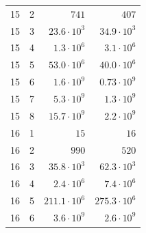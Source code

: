 \documentclass[a4paper,UKenglish,cleveref, autoref, thm-restate, anonymous]{lipics-v2021}
\begin{document}
\begin{table}[!t]
\begin{tabular}{c|c|r|r}
    15  & 2   & $741$                   & $407$                    \\
    15  & 3   & $23.6 \cdot 10^3$       & $34.9 \cdot 10^3$        \\
    15  & 4   & $1.3 \cdot 10^6$        & $3.1 \cdot 10^6$         \\
    15  & 5   & $53.0 \cdot 10^6$       & $40.0 \cdot 10^6$        \\
    15  & 6   & $1.6 \cdot 10^9$        & $0.73 \cdot 10^9$        \\
    15  & 7   & $5.3 \cdot 10^9$        & $1.3 \cdot 10^9$         \\
    15  & 8   & $15.7 \cdot 10^9$       & $2.2 \cdot 10^9$         \\
    \hline
    16  & 1   & $15$                    & $16$                     \\
    16  & 2   & $990$                   & $520$                    \\
    16  & 3   & $35.8 \cdot 10^3$       & $62.3 \cdot 10^3$        \\
    16  & 4   & $2.4 \cdot 10^6$        & $7.4 \cdot 10^6$         \\
    16  & 5   & $211.1 \cdot 10^6$      & $275.3 \cdot 10^6$       \\
    16  & 6   & $3.6 \cdot 10^9$        & $2.6 \cdot 10^9$         \\
  \end{tabular}
\end{table}
\end{document}
